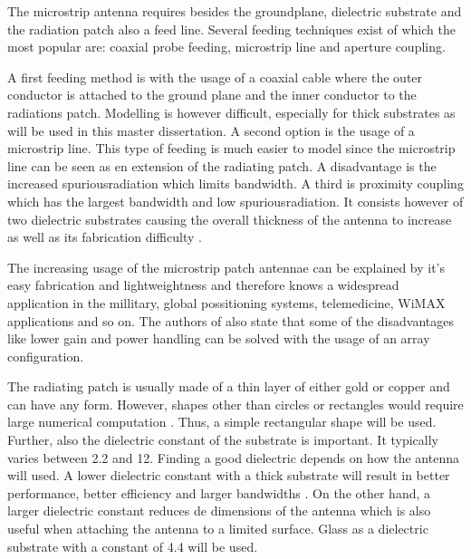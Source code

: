 The microstrip antenna requires besides the groundplane, dielectric substrate and the radiation patch also a feed line. Several feeding techniques exist of which the most popular are: coaxial probe feeding, microstrip line and aperture coupling. %

A first feeding method is with the usage of a coaxial cable where the outer conductor is attached to the ground plane and the inner conductor to the radiations patch. Modelling is however difficult, especially for thick substrates as will be used in this master dissertation.
A second option is the usage of a microstrip line. This type of feeding is much easier to model since the microstrip line can be seen as en extension of the radiating patch.
A disadvantage is the increased \gls{spuriousradiation} which limits bandwidth.
A third is proximity coupling which has the largest bandwidth and low \gls{spuriousradiation}. It consists however of two dielectric substrates causing the overall thickness
of the antenna to increase as well as its fabrication difficulty \cite{J13_singh2011micro}.

The increasing usage of the microstrip patch antennae can be explained by it's easy fabrication and lightweightness and therefore knows a widespread application in the millitary, global possitioning systems, telemedicine, WiMAX applications and so on.
The authors of \cite{J13_microstripadvantages} also state that some of the disadvantages like lower gain and power handling can be solved with the usage of an array configuration.

The radiating patch is usually made of a thin layer of either gold or copper \cite{J14_antennadesign,J15_antennadesign}
and can have any form. However, shapes other than circles or rectangles would require large numerical computation \cite{J14_antennadesign}.
Thus, a simple rectangular shape will be used.
Further, also the dielectric constant of the substrate is important. It typically varies between 2.2 and 12.
Finding a good dielectric depends on how the antenna will used. A lower
dielectric constant with a thick substrate will result in better performance, better efficiency and larger bandwidths  \cite{J15_antennadesign}.
On the other hand, a larger dielectric constant reduces de dimensions of the antenna \cite{J14_antennadesign}
which is also useful when attaching the 
antenna to a limited surface. Glass as a dielectric substrate with a constant of 4.4 will be used.